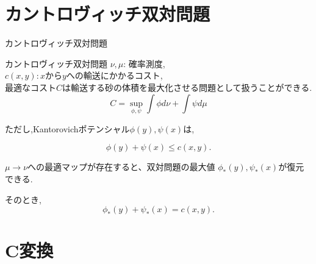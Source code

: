 \documentclass[aspectratio=169, dvipdfmx, 12pt]{beamer}
\begin{document}
\section{カントロヴィッチ双対問題}
\begin{frame}{カントロヴィッチ双対問題}
    \begin{block}{カントロヴィッチ双対問題}
        $\nu, \mu$: 確率測度, \quad
        $c(x, y) : x \text{から$y$への輸送にかかるコスト}$,\\
        \vspace{\baselineskip} 
        最適なコスト$C$は輸送する砂の体積を最大化させる問題として扱うことができる.
        \begin{equation*}
            C = \sup_{\phi, \psi} \int \phi  d\nu + \int \psi  d\mu 
        \end{equation*}

        ただし,Kantorovichポテンシャル$\phi(y), \psi(x)$は, 
    
        \begin{equation*}
            \phi(y) + \psi(x) \le c(x, y).
        \end{equation*}
    \end{block}
    $\mu \to \nu$への最適マップが存在すると、双対問題の最大値 $\phi_*(y), \psi_*(x)$が復元できる.

    そのとき, 
    \begin{equation*}
        \phi_*(y) + \psi_*(x) = c(x, y).
    \end{equation*}

\end{frame}

\section{C変換}
\end{document}
